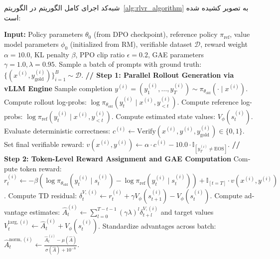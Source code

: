 شبه‌کد اجرای کامل الگوریتم  در الگوریتم~\ref{alg:rlvr_algorithm} به تصویر کشیده شده است:

\begin{latin}
\begin{algorithm}[H]
\caption{Reinforcement Learning with Verifiable Rewards (RLVR)}
\label{alg:rlvr_algorithm}
\begin{algorithmic}[1]
\State \textbf{Input:} Policy parameters $\theta_0$ (from DPO checkpoint), reference policy $\pi_{\text{ref}}$, value model parameters $\phi_0$ (initialized from RM), verifiable dataset $\mathcal{D}$, reward weight $\alpha = 10.0$, KL penalty $\beta$, PPO clip ratio $\epsilon = 0.2$, GAE parameters $\gamma = 1.0, \lambda = 0.95$.
    \State Sample a batch of prompts with ground truth: $\{(x^{(i)}, y_{\text{gold}}^{(i)})\}_{i=1}^B \sim \mathcal{D}$.
    \State \textbf{// Step 1: Parallel Rollout Generation via vLLM Engine}
        \State Sample completion $y^{(i)} = (y_1^{(i)}, \dots, y_T^{(i)}) \sim \pi_{\theta_{\text{old}}}(\cdot \mid x^{(i)})$.
        \State Compute rollout log-probs: $\log \pi_{\theta_{\text{old}}}(y_t^{(i)} \mid x^{(i)}, y_{<t}^{(i)})$.
        \State Compute reference log-probs: $\log \pi_{\text{ref}}(y_t^{(i)} \mid x^{(i)}, y_{<t}^{(i)})$.
        \State Compute estimated state values: $V_\phi(s_t^{(i)})$.
        \State Evaluate deterministic correctness: $c^{(i)} \leftarrow \text{Verify}(x^{(i)}, y^{(i)}, y_{\text{gold}}^{(i)}) \in \{0, 1\}$.
        \State Set final verifiable reward: $v(x^{(i)}, y^{(i)}) \leftarrow \alpha \cdot c^{(i)} - 10.0 \cdot \mathbb{I}_{[y_T^{(i)} \neq \text{EOS}]}$.
    \EndFor
    \State \textbf{// Step 2: Token-Level Reward Assignment and GAE Computation}
        \State Compute token reward: 
        \State \quad $r_t^{(i)} \leftarrow -\beta \left( \log \pi_{\theta_{\text{old}}}(y_t^{(i)} \mid s_t^{(i)}) - \log \pi_{\text{ref}}(y_t^{(i)} \mid s_t^{(i)}) \right) + \mathbb{I}_{[t=T]} \cdot v(x^{(i)}, y^{(i)})$.
        \State Compute TD residual: $\delta_t^{V, (i)} \leftarrow r_t^{(i)} + \gamma V_\phi(s_{t+1}^{(i)}) - V_\phi(s_t^{(i)})$.
    \EndFor
    \State Compute advantage estimates: $\hat{A}_t^{(i)} \leftarrow \sum_{l=0}^{T-t-1} (\gamma \lambda)^l \delta_{t+l}^{V, (i)}$ and target values $V_t^{\text{targ}, (i)} \leftarrow \hat{A}_t^{(i)} + V_\phi(s_t^{(i)})$.
    \State Standardize advantages across batch: $\hat{A}_t^{\text{norm}, (i)} \leftarrow \frac{\hat{A}_t^{(i)} - \mu(\hat{A})}{\sigma(\hat{A}) + 10^{-8}}$.

\end{algorithmic}
\end{algorithm}
\end{latin}
